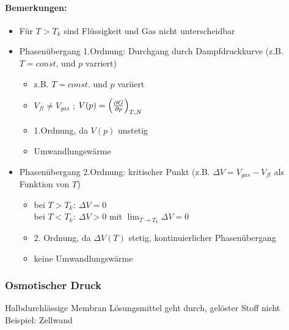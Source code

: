 \paragraph{Bemerkungen:}
\begin{itemize}
    \item Für $T>T_k$ sind Flüssigkeit und Gas nicht unterscheidbar
    \item Phasenübergang 1.Ordnung: Durchgang durch Dampfdruckkurve (z.B. $T=const$, und $p$ varriert)
    \begin{itemize}
        \item z.B. $T=const.$ und $p$ variiert
        \item $V_{fl} \neq V_{gas}$ ; $V(p)=\left(\pdv{G}{p}\right)_{T,N}$
        \item 1.Ordnung, da $V(p)$ unstetig
        \item Umwandlungswärme
    \end{itemize}
    \item Phasenübergang 2.Ordnung: kritischer Punkt (z.B. $\Delta V = V_{gas}-V_{fl}$ als Funktion von $T$)
    \begin{itemize}
        \item bei $T>T_k: \ \Delta V = 0$\\
        bei $T<T_k: \ \Delta V > 0$ mit $\lim_{T\rightarrow T_k} \Delta V = 0$
        \item 2. Ordnung, da $\Delta V(T)$ stetig, kontinuierlicher Phasenübergang
        \item keine Umwandlungswärme
    \end{itemize}
\end{itemize}


\subsubsection{Osmotischer Druck}
\begin{definition}{Halbdurchlässige Membran}
    Lösungsmittel geht durch, gelöster Stoff nicht\\
    Beispiel: Zellwand
\end{definition}
\begin{center}
\end{center}


